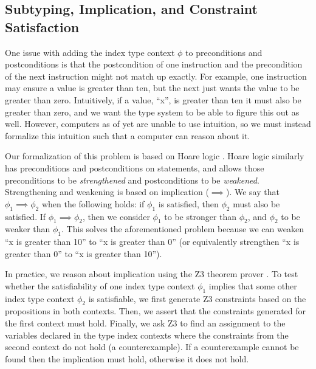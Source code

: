 \subsection{Subtyping, Implication, and Constraint Satisfaction}
One issue with adding the index type context $\phi$ to preconditions and postconditions is that the postcondition of one instruction and the precondition of the next instruction might not match up exactly.
For example, one instruction may ensure a value is greater than ten, but the next just wants the value to be greater than zero.
Intuitively, if a value, ``x'', is greater than ten it must also be greater than zero, and we want the \name type system to be able to figure this out as well.
However, computers as of yet are unable to use intuition, so we must instead formalize this intuition such that a computer can reason about it.

Our formalization of this problem is based on Hoare logic .
Hoare logic similarly has preconditions and postconditions on statements, and allows those preconditions to be \emph{strengthened} and postconditions to be \emph{weakened}.
Strengthening and weakening is based on implication ($\implies$).
We say that $\phi_1 \implies \phi_2$ when the following holds: if $\phi_1$ is satisfied, then $\phi_2$ must also be satisfied.
If $\phi_1 \implies \phi_2$, then we consider $\phi_1$ to be stronger than $\phi_2$, and $\phi_2$ to be weaker than $\phi_1$.
This solves the aforementioned problem because we can weaken ``x is greater than 10'' to ``x is greater than 0'' (or equivalently strengthen ``x is greater than 0'' to ``x is greater than 10'').

In practice, we reason about implication using the Z3 theorem prover .
To test whether the satisfiability of one index type context $\phi_1$ implies that some other index type context $\phi_2$ is satisfiable, we first generate Z3 constraints based on the propositions in both contexts.
Then, we assert that the constraints generated for the first context must hold.
Finally, we ask Z3 to find an assignment to the variables declared in the type index contexts where the constraints from the second context do not hold (a counterexample).
If a counterexample cannot be found then the implication must hold, otherwise it does not hold.

